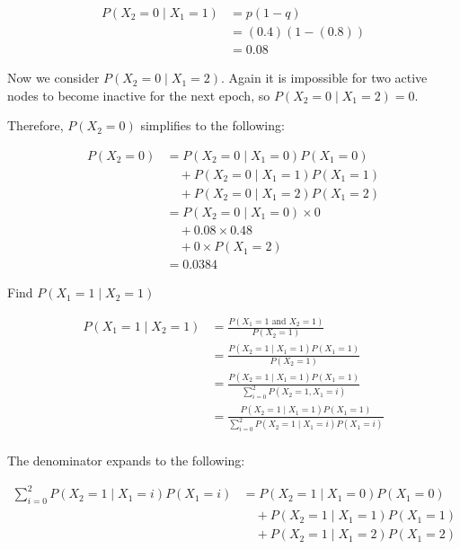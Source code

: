 \documentclass{amsart}
\theoremstyle{definition} %
\begin{document}
\begin{equation}
  \begin{aligned}
    P(X_2=0 \mid X_1=1) &= p(1-q) \\
    &= (0.4)(1-(0.8)) \\
    &= 0.08
  \end{aligned}
\end{equation}

Now we consider $P(X_2=0 \mid X_1=2)$. Again it is impossible for two active
nodes to become inactive for the next epoch, so $P(X_2=0 \mid X_1=2) = 0$.

Therefore, $P(X_2=0)$ simplifies to the following:

\begin{equation}
  \begin{aligned}
    P(X_2=0) &= P(X_2 = 0 \mid X_1 = 0)P(X_1 = 0) \\
    &\quad + P(X_2 = 0 \mid X_1 = 1)P(X_1 = 1) \\
    &\quad + P(X_2 = 0 \mid X_1 = 2)P(X_1 = 2) \\
    &= P(X_2 = 0 \mid X_1 = 0) \times 0 \\
    &\quad + 0.08 \times 0.48 \\
    &\quad + 0 \times P(X_1 = 2) \\
    &= 0.0384
  \end{aligned}
\end{equation}

Find $P(X_{1} = 1 \mid X_{2} = 1)$


\begin{equation}
  \begin{aligned}
    P(X_{1} = 1 \mid X_{2} = 1) &= \frac{P(X_1=1 \text{ and } X_2=1)}{P(X_2 = 1)} \\
    &= \frac{P(X_2=1 \mid X_1=1)P(X_1=1) }{P(X_2 = 1)} \\
    &= \frac{P(X_2=1 \mid X_1=1)P(X_1=1) }{\sum_{i=0}^{2}P(X_2 = 1, X_1=i)} \\
    &= \frac{P(X_2=1 \mid X_1=1)P(X_1=1) }{\sum_{i=0}^{2}P(X_2 = 1 \mid X_1=i)P(X_1=i)} \\
  \end{aligned}
\end{equation}

The denominator expands to the following:

\begin{equation}
  \begin{aligned}
    \sum_{i=0}^{2}P(X_2 = 1 \mid X_1=i)P(X_1=i) &= P(X_2 = 1 \mid X_1=0)P(X_1=0) \\
    &\quad + P(X_2 = 1 \mid X_1=1)P(X_1=1) \\
    &\quad + P(X_2 = 1 \mid X_1=2)P(X_1=2) \\
  \end{aligned}
\end{equation}
\end{document}
